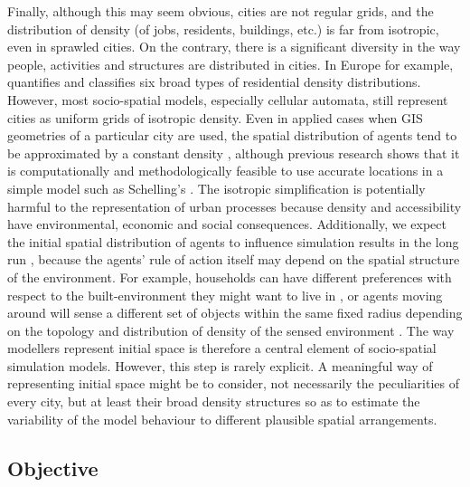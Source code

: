 \documentclass{JASSS}
\begin{document}
Finally, although this may seem obvious, cities are not regular grids, and the distribution of density (of jobs, residents, buildings, etc.) is far from isotropic, even in sprawled cities. On the contrary, there is a significant diversity in the way people, activities and structures are distributed in cities. In Europe for example, \citet{LeNechet2015} quantifies and classifies six broad types of residential density distributions. However, most socio-spatial models, especially cellular automata, still represent cities as uniform grids of isotropic density. Even in applied cases when GIS geometries of a particular city are used, the spatial distribution of agents tend to be approximated by a constant density \citep{arribas2014diverse}, although previous research shows that it is computationally and methodologically feasible to use accurate locations in a simple model such as Schelling's \citep{benenson2002entity}. The isotropic simplification is potentially harmful to the representation of urban processes because density and accessibility have environmental, economic and social consequences. Additionally, we expect the initial spatial distribution of agents to influence simulation results in the long run \citep{Castellanoetal2009}, because the agents' rule of action itself may depend on the spatial structure of the environment. For example, households can have different preferences with respect to the built-environment they might want to live in \citep{SpielmanHarrison2014}, or agents moving around will sense a different set of objects within the same fixed radius depending on the topology \citep{Banos2012} and distribution of density of the sensed environment \citep{LauriJaggi2003, FossettDietrich2009}. The way modellers represent initial space is therefore a central element of socio-spatial simulation models. However, this step is rarely explicit. A meaningful way of representing initial space might be to consider, not necessarily the peculiarities of every city, but at least their broad density structures so as to estimate the variability of the model behaviour to different plausible spatial arrangements.

\subsection{Objective}

\end{document}
